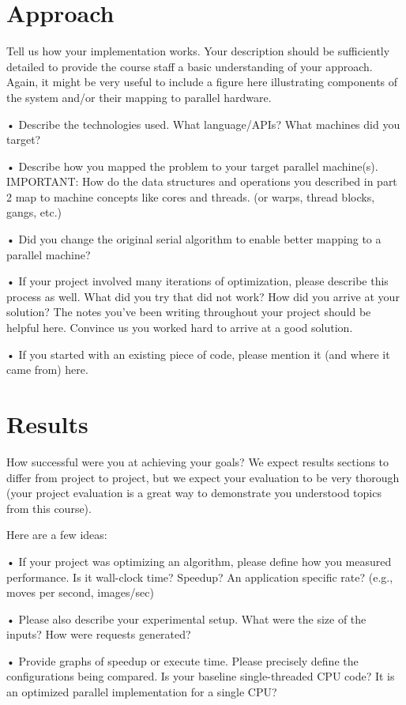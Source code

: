 \documentclass[11pt]{article}
\begin{document}
\section{Approach}

Tell us how your implementation works. Your description should be sufficiently detailed to provide the course staff a basic understanding of your approach. Again, it might be very useful to include a figure here illustrating components of the system and/or their mapping to parallel hardware. 

• Describe the technologies used. What language/APIs? What machines did you target?

• Describe how you mapped the problem to your target parallel machine(s). IMPORTANT: How do the data structures and operations you described in part 2 map to machine concepts like cores and threads. (or warps, thread blocks, gangs, etc.)

• Did you change the original serial algorithm to enable better mapping to a parallel machine?

• If your project involved many iterations of optimization, please describe this process as well. What did you try that did not work? How did you arrive at your solution? The notes you’ve been writing throughout your project should be helpful here. Convince us you worked hard to arrive at a good solution.

• If you started with an existing piece of code, please mention it (and where it came
from) here.

\section{Results}

How successful were you at achieving your goals? We expect results sections to differ from project to project, but we expect your evaluation to be very thorough (your project evaluation is a great way to demonstrate you understood topics from this course).

Here are a few ideas:

• If your project was optimizing an algorithm, please define how you measured performance. Is it wall-clock time? Speedup? An application specific rate? (e.g., moves per second, images/sec)

• Please also describe your experimental setup. What were the size of the inputs? How were requests generated?

• Provide graphs of speedup or execute time. Please precisely define the configurations being compared. Is your baseline single-threaded CPU code? It is an optimized parallel implementation for a single CPU?
\end{document}

